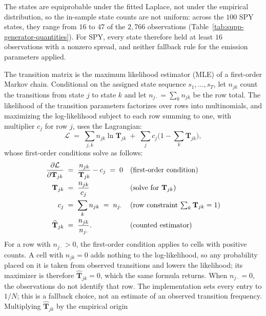 The states are equiprobable under the fitted Laplace, not under the
empirical distribution, so the in-sample state counts are not uniform:
across the $100$ SPY states, they range from $16$ to $47$ of the
$2{,}766$ observations (Table~\ref{tab:supp-generator-quantities}).
For SPY, every state therefore held at least $16$ observations with a
nonzero spread, and neither fallback rule for the emission parameters
applied.

The transition matrix is the maximum likelihood estimator (MLE) of a
first-order Markov chain. Conditional on the assigned state sequence
$s_1, \dots, s_T$, let $n_{jk}$ count the transitions from state $j$
to state $k$ and let $n_{j \cdot} = \sum_k n_{jk}$ be the row total.
The likelihood of the transition parameters factorizes over rows into
multinomials, and maximizing the log-likelihood subject to each row
summing to one, with multiplier $c_j$ for row $j$, uses the
Lagrangian:
\begin{equation}
  \mathcal{L} \;=\; \sum_{j, k} n_{jk} \ln \mathbf{T}_{jk}
    \;+\; \sum_{j} c_{j} \Big(1 - \sum_{k} \mathbf{T}_{jk}\Big),
  \label{eq:supp-lagrangian}
\end{equation}
whose first-order conditions solve as follows:
\begin{align}
  \frac{\partial \mathcal{L}}{\partial \mathbf{T}_{jk}}
   &\;=\; \frac{n_{jk}}{\mathbf{T}_{jk}} - c_j \;=\; 0
     && \text{(first-order condition)} \notag \\
  \mathbf{T}_{jk}
   &\;=\; \frac{n_{jk}}{c_j}
     && \text{(solve for $\mathbf{T}_{jk}$)} \notag \\
  c_j
   &\;=\; \sum_{k} n_{jk} \;=\; n_{j \cdot}
     && \text{(row constraint $\textstyle\sum_k \mathbf{T}_{jk} = 1$)} \notag \\
  \widehat{\mathbf{T}}_{jk}
   &\;=\; \frac{n_{jk}}{n_{j \cdot}}.
     && \text{(counted estimator)}
  \label{eq:supp-markov-mle}
\end{align}
For a row with $n_{j\cdot}>0$, the first-order condition applies to
cells with positive counts. A cell with $n_{jk}=0$ adds nothing to the
log-likelihood, so any probability placed on it is taken from observed
transitions and lowers the likelihood; its maximizer is therefore
$\widehat{\mathbf{T}}_{jk}=0$, which the same formula returns.
When $n_{j\cdot}=0$, the observations do not identify that row.
The implementation sets every entry to $1/N$; this is a fallback
choice, not an estimate of an observed transition frequency.
Multiplying $\widehat{\mathbf{T}}_{jk}$ by the empirical origin
